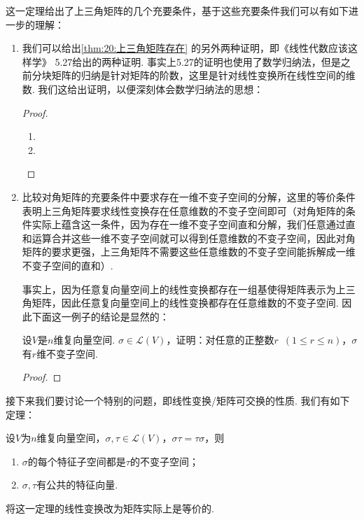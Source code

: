 这一定理给出了上三角矩阵的几个充要条件，基于这些充要条件我们可以有如下进一步的理解：
\begin{enumerate}
    \item 我们可以给出\autoref{thm:20:上三角矩阵存在} 的另外两种证明，即《线性代数应该这样学》
          5.27给出的两种证明. 事实上5.27的证明也使用了数学归纳法，但是之前分块矩阵的归纳是针对矩阵的阶数，这里是针对线性变换所在线性空间的维数. 我们这给出证明，以便深刻体会数学归纳法的思想：

          \begin{proof}
              \begin{enumerate}
                  \item

                  \item
              \end{enumerate}
          \end{proof}

    \item 比较对角矩阵的充要条件中要求存在一维不变子空间的分解，这里的等价条件表明上三角矩阵要求线性变换存在任意维数的不变子空间即可（对角矩阵的条件实际上蕴含这一条件，因为存在一维不变子空间直和分解，我们任意通过直和运算合并这些一维不变子空间就可以得到任意维数的不变子空间，因此对角矩阵的要求更强，上三角矩阵不需要这些任意维数的不变子空间能拆解成一维不变子空间的直和）.

          事实上，因为任意复向量空间上的线性变换都存在一组基使得矩阵表示为上三角矩阵，因此任意复向量空间上的线性变换都存在任意维数的不变子空间. 因此下面这一例子的结论是显然的：
          \begin{example}
              设$V$是$n$维复向量空间. $\sigma\in \mathcal{L}(V)$，证明：对任意的正整数$r\enspace(1\leqslant r\leqslant n)$，$\sigma$有$r$维不变子空间.
          \end{example}
          \begin{proof}

          \end{proof}
\end{enumerate}

接下来我们要讨论一个特别的问题，即线性变换/矩阵可交换的性质. 我们有如下定理：
\begin{theorem}
    设$V$为$n$维复向量空间，$\sigma,\tau\in \mathcal{L}(V)$，$\sigma\tau=\tau\sigma$，则
    \begin{enumerate}
        \item $\sigma$的每个特征子空间都是$\tau$的不变子空间；

        \item $\sigma,\tau$有公共的特征向量.
    \end{enumerate}
\end{theorem}
将这一定理的线性变换改为矩阵实际上是等价的.

